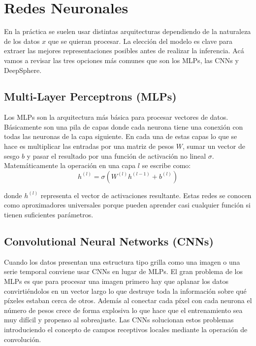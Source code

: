 \section{Redes Neuronales}
\label{sec:redes_neuronales}

En la práctica se suelen usar distintas arquitecturas dependiendo de la naturaleza de los datos $x$ que se quieran procesar. La elección del modelo es clave para extraer las mejores representaciones posibles antes de realizar la inferencia. Acá vamos a revisar las tres opciones más comunes que son los MLPs, las CNNs y DeepSphere.

\subsection{Multi-Layer Perceptrons (MLPs)}
\label{subsec:mlps}

Los MLPs son la arquitectura más básica para procesar vectores de datos. Básicamente son una pila de capas donde cada neurona tiene una conexión con todas las neuronas de la capa siguiente. En cada una de estas capas lo que se hace es multiplicar las entradas por una matriz de pesos $W$, sumar un vector de sesgo $b$ y pasar el resultado por una función de activación no lineal $\sigma$. Matemáticamente la operación en una capa $l$ se escribe como:
\begin{equation}
    h^{(l)} = \sigma(W^{(l)} h^{(l-1)} + b^{(l)})
\end{equation}

donde $h^{(l)}$ representa el vector de activaciones resultante. Estas redes se conocen como aproximadores universales porque pueden aprender casi cualquier función si tienen suficientes parámetros.

\subsection{Convolutional Neural Networks (CNNs)}
\label{subsec:cnns}

Cuando los datos presentan una estructura tipo grilla como una imagen o una serie temporal conviene usar CNNs en lugar de MLPs. El gran problema de los MLPs es que para procesar una imagen primero hay que aplanar los datos convirtiéndolos en un vector largo lo que destruye toda la información sobre qué píxeles estaban cerca de otros. Además al conectar cada píxel con cada neurona el número de pesos crece de forma explosiva lo que hace que el entrenamiento sea muy difícil y propenso al sobreajuste. Las CNNs solucionan estos problemas introduciendo el concepto de campos receptivos locales mediante la operación de convolución.


